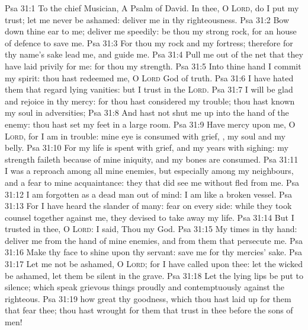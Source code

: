 \vs Psa 31:1 To the chief Musician, A Psalm of David. In thee, O \textsc{Lord}, do I put my trust; let me never be ashamed: deliver me in thy righteousness.
\vs Psa 31:2 Bow down thine ear to me; deliver me speedily: be thou my strong rock, for an house of defence to save me.
\vs Psa 31:3 For thou  my rock and my fortress; therefore for thy name's sake lead me, and guide me.
\vs Psa 31:4 Pull me out of the net that they have laid privily for me: for thou  my strength.
\vs Psa 31:5 Into thine hand I commit my spirit: thou hast redeemed me, O \textsc{Lord} God of truth.
\vs Psa 31:6 I have hated them that regard lying vanities: but I trust in the \textsc{Lord}.
\vs Psa 31:7 I will be glad and rejoice in thy mercy: for thou hast considered my trouble; thou hast known my soul in adversities;
\vs Psa 31:8 And hast not shut me up into the hand of the enemy: thou hast set my feet in a large room.
\vs Psa 31:9 Have mercy upon me, O \textsc{Lord}, for I am in trouble: mine eye is consumed with grief, , my soul and my belly.
\vs Psa 31:10 For my life is spent with grief, and my years with sighing: my strength faileth because of mine iniquity, and my bones are consumed.
\vs Psa 31:11 I was a reproach among all mine enemies, but especially among my neighbours, and a fear to mine acquaintance: they that did see me without fled from me.
\vs Psa 31:12 I am forgotten as a dead man out of mind: I am like a broken vessel.
\vs Psa 31:13 For I have heard the slander of many: fear  on every side: while they took counsel together against me, they devised to take away my life.
\vs Psa 31:14 But I trusted in thee, O \textsc{Lord}: I said, Thou  my God.
\vs Psa 31:15 My times  in thy hand: deliver me from the hand of mine enemies, and from them that persecute me.
\vs Psa 31:16 Make thy face to shine upon thy servant: save me for thy mercies' sake.
\vs Psa 31:17 Let me not be ashamed, O \textsc{Lord}; for I have called upon thee: let the wicked be ashamed,  let them be silent in the grave.
\vs Psa 31:18 Let the lying lips be put to silence; which speak grievous things proudly and contemptuously against the righteous.
\vs Psa 31:19  how great  thy goodness, which thou hast laid up for them that fear thee;  thou hast wrought for them that trust in thee before the sons of men!
